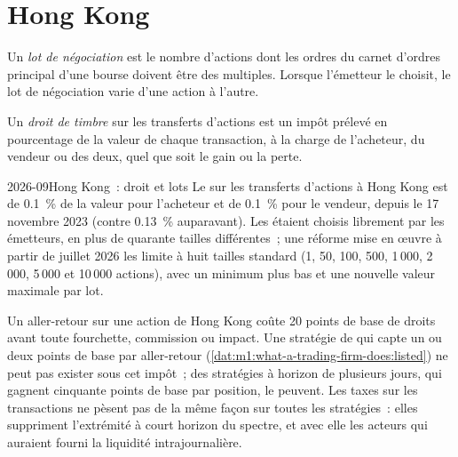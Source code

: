 \section{Hong Kong}

\begin{definition}\label{def:m1:asian-and-emerging-equity-markets:lot}
Un \emph{lot de négociation} est le nombre d'actions dont les ordres
du carnet d'ordres principal d'une bourse doivent être des multiples. Lorsque l'émetteur
le choisit, le lot de négociation varie d'une action à l'autre.
\end{definition}

\begin{definition}\label{def:m1:asian-and-emerging-equity-markets:stamp}
Un \emph{droit de timbre} sur les transferts d'actions est un impôt prélevé en
pourcentage de la valeur de chaque transaction, à la charge de l'acheteur, du vendeur ou des deux,
quel que soit le gain ou la perte.
\end{definition}

\begin{dated}{2026-09}{Hong Kong~: droit et lots}\label{dat:m1:asian-and-emerging-equity-markets:hk}
Le  sur les transferts d'actions à Hong Kong est de 0.1~\% de la valeur pour l'acheteur
et de 0.1~\% pour le vendeur, depuis le 17 novembre 2023 (contre 0.13~\% auparavant). Les  étaient choisis librement par les émetteurs, en plus de quarante tailles différentes~; une
réforme mise en œuvre à partir de juillet 2026 les limite à huit tailles standard (1, 50, 100, 500,
1\,000, 2\,000, 5\,000 et 10\,000 actions), avec un minimum plus bas et une nouvelle valeur maximale
par lot.
\end{dated}

\begin{example}\label{ex:m1:asian-and-emerging-equity-markets:duty}
Un aller-retour sur une action de Hong Kong coûte 20 points de base de droits avant toute
fourchette, commission ou impact. Une stratégie de  qui capte un ou deux points
de base par aller-retour
(\cref{dat:m1:what-a-trading-firm-does:listed}) ne peut pas exister sous cet impôt~;
des stratégies à horizon de plusieurs jours, qui gagnent cinquante points de base par position, le peuvent.
Les taxes sur les transactions ne pèsent pas de la même façon sur toutes les stratégies~: elles
suppriment l'extrémité à court horizon du spectre, et avec elle les acteurs qui auraient fourni la
liquidité intrajournalière.
\end{example}

